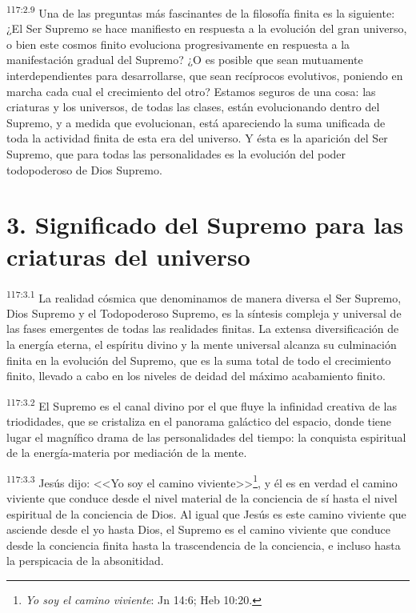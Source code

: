 \documentclass[twoside, 11pt]{book}
\begin{document}
\par
\textsuperscript{117:2.9} Una de las preguntas más fascinantes de la filosofía finita es la siguiente: ¿El Ser Supremo se hace manifiesto en respuesta a la evolución del gran universo, o bien este cosmos finito evoluciona progresivamente en respuesta a la manifestación gradual del Supremo? ¿O es posible que sean mutuamente interdependientes para desarrollarse, que sean recíprocos evolutivos, poniendo en marcha cada cual el crecimiento del otro? Estamos seguros de una cosa: las criaturas y los universos, de todas las clases, están evolucionando dentro del Supremo, y a medida que evolucionan, está apareciendo la suma unificada de toda la actividad finita de esta era del universo. Y ésta es la aparición del Ser Supremo, que para todas las personalidades es la evolución del poder todopoderoso de Dios Supremo.

\section*{3. Significado del Supremo para las criaturas del universo}
\par
\textsuperscript{117:3.1} La realidad cósmica que denominamos de manera diversa el Ser Supremo, Dios Supremo y el Todopoderoso Supremo, es la síntesis compleja y universal de las fases emergentes de todas las realidades finitas. La extensa diversificación de la energía eterna, el espíritu divino y la mente universal alcanza su culminación finita en la evolución del Supremo, que es la suma total de todo el crecimiento finito, llevado a cabo en los niveles de deidad del máximo acabamiento finito.

\par
\textsuperscript{117:3.2} El Supremo es el canal divino por el que fluye la infinidad creativa de las triodidades, que se cristaliza en el panorama galáctico del espacio, donde tiene lugar el magnífico drama de las personalidades del tiempo: la conquista espiritual de la energía-materia por mediación de la mente.

\par
\textsuperscript{117:3.3} Jesús dijo: <<Yo soy el camino viviente>>\footnote{\textit{Yo soy el camino viviente}: Jn 14:6; Heb 10:20.}, y él es en verdad el camino viviente que conduce desde el nivel material de la conciencia de sí hasta el nivel espiritual de la conciencia de Dios. Al igual que Jesús es este camino viviente que asciende desde el yo hasta Dios, el Supremo es el camino viviente que conduce desde la conciencia finita hasta la trascendencia de la conciencia, e incluso hasta la perspicacia de la absonitidad.
\end{document}
